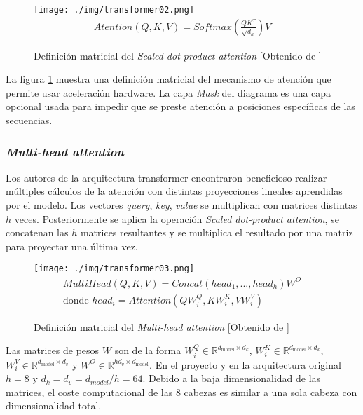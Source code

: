 \begin{figure}[H]
    \centering
    \texttt{[image: ./img/transformer02.png]}
    \begin{align*}
        Atention(Q,K,V) = Softmax\left(\frac{QK^{T}}{\sqrt{d_{k}}}\right)V
    \end{align*}
    \caption{Definición matricial del \textit{Scaled dot-product attention} [Obtenido de \cite{Vaswani2017Jun}]}\label{transformerscaleddotprodform}
\end{figure}

La figura \ref{transformerscaleddotprodform} muestra una definición matricial del mecanismo de atención que permite usar aceleración hardware. La capa \textit{Mask} del diagrama es una capa opcional usada para impedir que se preste atención a posiciones específicas de las secuencias.

\subsubsection{\textit{Multi-head attention}}
Los autores de la arquitectura transformer encontraron beneficioso realizar múltiples cálculos de la atención con distintas proyecciones lineales aprendidas por el modelo. Los vectores \textit{query}, \textit{key}, \textit{value} se multiplican con matrices distintas $h$ veces. Posteriormente se aplica la operación \textit{Scaled dot-product attention}, se concatenan las $h$ matrices resultantes y se multiplica el resultado por una matriz para proyectar una última vez.

\begin{figure}[H]
    \centering
    \texttt{[image: ./img/transformer03.png]}
    \begin{align*}
        MultiHead(Q,K,V) = Concat(head_{1},...,head_{h})W^{O}\\
        \text{donde }head_{i} = Attention(QW^{Q}_{i}, KW^{K}_{i}, VW^{V}_{i})
    \end{align*}
    \caption{Definición matricial del \textit{Multi-head attention} [Obtenido de \cite{Vaswani2017Jun}]}\label{transformerheads}
\end{figure}

Las matrices de pesos $W$ son de la forma $W_{i}^{Q}\in\mathbb{R}^{d_{\text{model}}\times d_{k}}$, $W_{i}^{K}\in\mathbb{R}^{d_{\text{model}}\times d_{k}}$, $W_{i}^{V}\in\mathbb{R}^{d_{\text{model}}\times d_{v}}$ y $W^{O}\in\mathbb{R}^{hd_{v}\times d_{\text{model}}}$. En el proyecto y en la arquitectura original $h=8$ y $d_{k}=d_{v}=d_{model}/h=64$. Debido a la baja dimensionalidad de las matrices, el coste computacional de las 8 cabezas es similar a una sola cabeza con dimensionalidad total.

